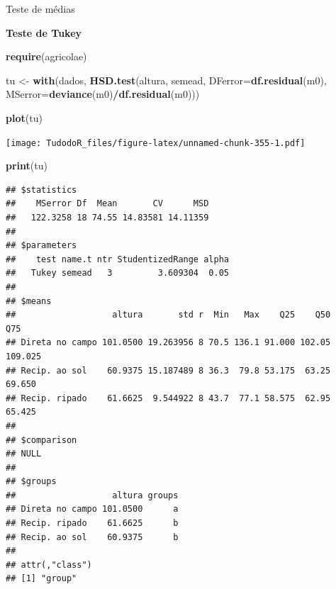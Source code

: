 \documentclass[
]{book}
\newenvironment{Shaded}{\begin{snugshade}}{\end{snugshade}}
\newcommand{\DataTypeTok}[1]{\textcolor[rgb]{0.13,0.29,0.53}{#1}}
\newcommand{\KeywordTok}[1]{\textcolor[rgb]{0.13,0.29,0.53}{\textbf{#1}}}
\newcommand{\NormalTok}[1]{#1}
\newcommand{\OperatorTok}[1]{\textcolor[rgb]{0.81,0.36,0.00}{\textbf{#1}}}
\newcommand{\StringTok}[1]{\textcolor[rgb]{0.31,0.60,0.02}{#1}}
\begin{document}
Teste de médias

\textbf{Teste de Tukey}

\begin{Shaded}
\begin{Highlighting}[]
\KeywordTok{require}\NormalTok{(agricolae)}
\end{Highlighting}
\end{Shaded}

\begin{Shaded}
\begin{Highlighting}[]
\NormalTok{tu <-}\StringTok{ }\KeywordTok{with}\NormalTok{(dados, }\KeywordTok{HSD.test}\NormalTok{(altura, semead,}
\DataTypeTok{DFerror=}\KeywordTok{df.residual}\NormalTok{(m0),}
\DataTypeTok{MSerror=}\KeywordTok{deviance}\NormalTok{(m0)}\OperatorTok{/}\KeywordTok{df.residual}\NormalTok{(m0)))}
\end{Highlighting}
\end{Shaded}

\begin{Shaded}
\begin{Highlighting}[]
\KeywordTok{plot}\NormalTok{(tu)}
\end{Highlighting}
\end{Shaded}

\texttt{[image: TudodoR\_files/figure-latex/unnamed-chunk-355-1.pdf]}

\begin{Shaded}
\begin{Highlighting}[]
\KeywordTok{print}\NormalTok{(tu)}
\end{Highlighting}
\end{Shaded}

\begin{verbatim}
## $statistics
##    MSerror Df  Mean       CV      MSD
##   122.3258 18 74.55 14.83581 14.11359
## 
## $parameters
##    test name.t ntr StudentizedRange alpha
##   Tukey semead   3         3.609304  0.05
## 
## $means
##                   altura       std r  Min   Max    Q25    Q50     Q75
## Direta no campo 101.0500 19.263956 8 70.5 136.1 91.000 102.05 109.025
## Recip. ao sol    60.9375 15.187489 8 36.3  79.8 53.175  63.25  69.650
## Recip. ripado    61.6625  9.544922 8 43.7  77.1 58.575  62.95  65.425
## 
## $comparison
## NULL
## 
## $groups
##                   altura groups
## Direta no campo 101.0500      a
## Recip. ripado    61.6625      b
## Recip. ao sol    60.9375      b
## 
## attr(,"class")
## [1] "group"
\end{verbatim}
\end{document}
